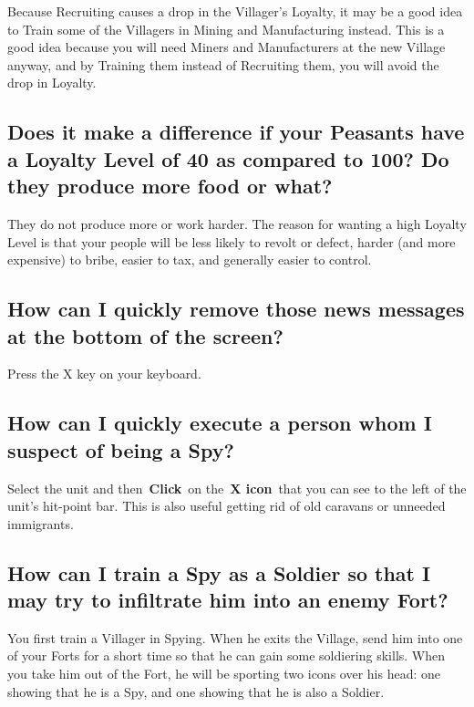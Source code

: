 Because Recruiting causes a drop in the Villager’s Loyalty, it may be a good idea to Train some of the Villagers in Mining and Manufacturing instead. This is a good idea because you will need Miners and Manufacturers at the new Village anyway, and by Training them instead of Recruiting them, you will avoid the drop in Loyalty.

\subsection{Does it make a difference if your Peasants have a Loyalty Level of 40 as compared to 100? Do they produce more food or what?}

They do not produce more or work harder. The reason for wanting a high Loyalty Level is that your people will be less likely to revolt or defect, harder (and more expensive) to bribe, easier to tax, and generally easier to control.

\subsection{How can I quickly remove those news messages at the bottom of the screen?}

Press the X key on your keyboard.

\subsection{How can I quickly execute a person whom I suspect of being a Spy?}

Select the unit and then \textbf{Click} on the \textbf{X icon} that you can see to the left of the unit’s hit-point bar. This is also useful getting rid of old caravans or unneeded immigrants.

\subsection{How can I train a Spy as a Soldier so that I may try to infiltrate him into an enemy Fort?}

You first train a Villager in Spying. When he exits the Village, send him into one of your Forts for a short time so that he can gain some soldiering skills. When you take him out of the Fort, he will be sporting two icons over his head: one showing that he is a Spy, and one showing that he is also a Soldier.